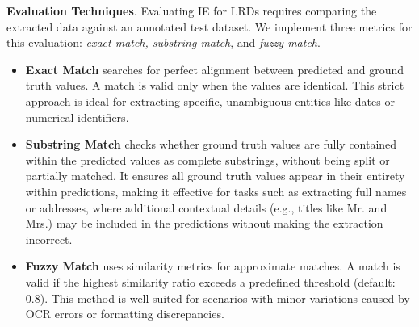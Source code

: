 \noindent \textbf{Evaluation Techniques}.
\label{subsec:evaluation_techniques} 
Evaluating IE for LRDs requires comparing the extracted data against an annotated test dataset. We implement three metrics for this evaluation: \textit{exact match, substring match}, and \textit{fuzzy match}.








\begin{itemize}[leftmargin=*,noitemsep,topsep=0pt]
\item \textbf{Exact Match} searches for perfect alignment between predicted and ground truth values. A match is valid only when the values are identical. This strict approach is ideal for extracting specific, unambiguous entities like dates or numerical identifiers.

\item \textbf{Substring Match} checks whether ground truth values are fully contained within the predicted values as complete substrings, without being split or partially matched. It ensures all ground truth values appear in their entirety within predictions, making it effective for tasks such as extracting full names or addresses, where additional contextual details (e.g., titles like Mr. and Mrs.) may be included in the predictions without making the extraction incorrect.

\item  \textbf{Fuzzy Match} uses similarity metrics for approximate matches. A match is valid if the highest similarity ratio exceeds a predefined threshold (default: 0.8). This method is well-suited for scenarios with minor variations caused by OCR errors or formatting discrepancies.
\end{itemize}




















